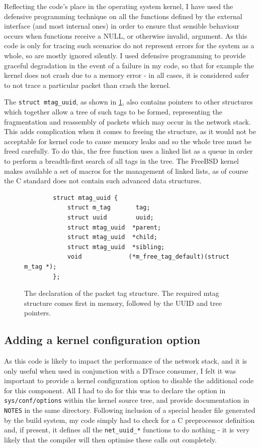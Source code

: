 \documentclass[a4paper,12pt,twoside,openright]{report}
\begin{document}
	Reflecting the code's place in the operating system kernel, I have used the defensive programming technique on all the functions defined by the external interface (and most internal ones) in order to ensure that sensible behaviour occurs when functions receive a NULL, or otherwise invalid, argument. As this code is only for tracing such scenarios do not represent errors for the system as a whole, so are mostly ignored silently. I used defensive programming to provide graceful degradation in the event of a failure in my code, so that for example the kernel does not crash due to a memory error - in all cases, it is considered safer to not trace a particular packet than crash the kernel.
	
	The \verb|struct mtag_uuid|, as shown in \figurename{ \ref{fig:mtag_uuid}}, also contains pointers to other structures which together allow a tree of such tags to be formed, representing the fragmentation and reassembly of packets which may occur in the network stack. This adds complication when it comes to freeing the structure, as it would not be acceptable for kernel code to cause memory leaks and so the whole tree must be freed carefully. To do this, the free function uses a linked list as a queue in order to perform a breadth-first search of all tags in the tree. The FreeBSD kernel makes available a set of macros for the management of linked lists, as of course the C standard does not contain such advanced data structures.
	
	\begin{figure}
		\begin{verbatim}
		struct mtag_uuid {
		    struct m_tag       tag;
		    struct uuid        uuid;
		    struct mtag_uuid  *parent;
		    struct mtag_uuid  *child;
		    struct mtag_uuid  *sibling;
		    void             (*m_free_tag_default)(struct m_tag *);
		};
		\end{verbatim}
		\caption{The declaration of the packet tag structure. The required mtag structure comes first in memory, followed by the UUID and tree pointers.}
		\label{fig:mtag_uuid}
	\end{figure}
	
	\subsection{Adding a kernel configuration option}
	
	As this code is likely to impact the performance of the network stack, and it is only useful when used in conjunction with a DTrace consumer, I felt it was important to provide a kernel configuration option to disable the additional code for this component. All I had to do for this was to declare the option in \verb|sys/conf/options| within the kernel source tree, and provide documentation in \verb|NOTES| in the same directory. Following inclusion of a special header file generated by the build system, my code simply had to check for a C preprocessor definition and, if present, it defines all the \verb|net_uuid_*| functions to do nothing - it is very likely that the compiler will then optimise these calls out completely.
	
\end{document}
